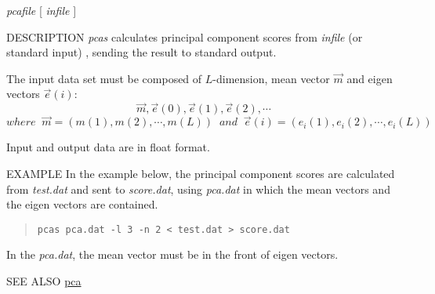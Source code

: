 \begin{synopsis}
 \item[pcas] [ --l $L$ ] [ --n $N$] {\em pcafile} [ {\em infile} ] 
\end{synopsis}

\begin{qsection}{DESCRIPTION}
 {\em pcas} calculates principal component scores
 from {\em infile} (or standard input) ,
 sending the result to standard output.

 The input data set must be composed of $L$-dimension,
 mean vector $\Vec{m}$ and eigen vectors $\Vec{e}(i)$:
\[
 \Vec{m}, \Vec{e}(0), \Vec{e}(1), \Vec{e}(2), \cdots
 \]
 \[
 where\;\;\Vec{m} = (m(1), m(2), \cdots, m(L))\;\;and\;\;
 \Vec{e}(i) = (e_{i}(1), e_{i}(2), \cdots, e_{i}(L))
\]

Input and output data are in float format. 
\end{qsection}

\begin{options}
\end{options}


\begin{qsection}{EXAMPLE}
 In the example below,
 the principal component scores are calculated
 from {\em test.dat} and sent to {\em score.dat},
 using {\em pca.dat}
 in which the mean vectors and the eigen vectors
 are contained.
\begin{quote}
  \verb!pcas pca.dat -l 3 -n 2 < test.dat > score.dat!
\end{quote} 
In the {\em pca.dat}, the mean vector must be in the front of
eigen vectors.
\end{qsection} 
\begin{qsection}{SEE ALSO}
 \hyperlink{pca}{pca}
\end{qsection}
